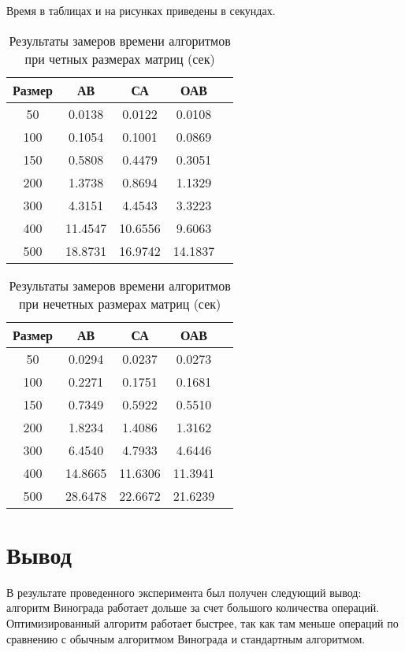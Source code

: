 Время в таблицах и на рисунках приведены в секундах.

\begin{table}[h]
	\begin{center}
		\caption{\label{tab:time1}Результаты замеров времени алгоритмов при четных размерах матриц (сек)}
		\begin{tabular}{|c|c|c|c|c|}
		\hline
		Размер & АВ &  СА & ОАВ \\
		\hline
		50  & 0.0138 & 0.0122 & 0.0108\\
		\hline
		100  & 0.1054 & 0.1001 & 0.0869\\
		\hline
		150  & 0.5808 & 0.4479 & 0.3051 \\
		\hline
		200  & 1.3738 & 0.8694 & 1.1329 \\
		\hline
		300  & 4.3151 & 4.4543 & 3.3223 \\
		\hline
		400  & 11.4547 & 10.6556 & 9.6063 \\
		\hline
		500  & 18.8731 & 16.9742 & 14.1837 \\
		\hline
		
		\end{tabular}
	\end{center}
\end{table}


\begin{table}[h]
	\begin{center}
		\caption{\label{tab:time2}Результаты замеров времени алгоритмов при нечетных размерах матриц (сек)}
		\begin{tabular}{|c|c|c|c|c|}
		\hline
		Размер & АВ &  СА & ОАВ \\
		\hline
		50  &0.0294 & 0.0237 & 0.0273\\
		\hline
		100  &0.2271 & 0.1751 & 0.1681\\
		\hline
		150  &0.7349 & 0.5922 & 0.5510 \\
		\hline
		200  &1.8234 &1.4086 & 1.3162 \\
		\hline
		300  & 6.4540 &4.7933 & 4.6446 \\
		\hline
		400  & 14.8665 & 11.6306 & 11.3941 \\
		\hline
		500  & 28.6478 & 22.6672 & 21.6239 \\
		\hline
		\end{tabular}
	\end{center}
\end{table}


\clearpage

\section*{Вывод}

В результате проведенного эксперимента был получен следующий вывод: алгоритм Винограда работает дольше за счет большого количества операций. Оптимизированный алгоритм работает быстрее, так как там меньше операций по сравнению с обычным алгоритмом Винограда и стандартным алгоритмом.  